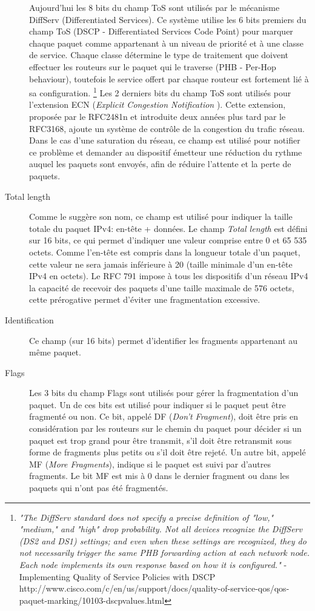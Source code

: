 \begin{description}
Aujourd'hui les 8 bits du champ ToS sont utilisés par le mécanisme DiffServ
(Differentiated Services). Ce système utilise les 6 bits premiers du champ
ToS (DSCP - Differentiated Services Code Point) pour marquer chaque paquet
comme appartenant à un niveau de priorité et à une classe de service. Chaque
classe détermine le type de traitement que doivent effectuer les routeurs sur le paquet qui le traverse
 (PHB - Per-Hop behaviour), toutefois le service offert
par chaque routeur est fortement lié à sa configuration.
\footnote {
{\it "The DiffServ standard does not specify a precise definition of "low," "medium,"
and "high" drop probability. Not all devices recognize the DiffServ (DS2 and
DS1) settings; and even when these settings are recognized, they do not
necessarily trigger the same PHB forwarding action at each network node. Each
node implements its own response based on how it is configured."} - 
Implementing Quality of Service Policies with DSCP
http://www.cisco.com/c/en/us/support/docs/quality-of-service-qos/qos-paquet-marking/10103-dscpvalues.html}
Les 2 derniers bits du champ ToS sont utilisés pour l'extension ECN ({\it Explicit Congestion
Notification }). Cette extension, proposée par le RFC2481n et introduite deux années plus tard par le RFC3168,
ajoute un système de contrôle de la congestion du trafic réseau. Dans le cas d'une saturation
du réseau, ce champ est utilisé pour notifier ce problème et demander au dispositif émetteur
une réduction du rythme auquel les paquets sont envoyés, afin de réduire l'attente et
la perte de paquets.

\item [Total length]
Comme le suggère son nom, ce champ est utilisé pour indiquer la taille totale du
paquet IPv4: en-tête + données. Le champ {\it Total length} est défini sur 16
bits, ce qui permet d'indiquer une valeur comprise entre 0 et 65 535 octets. Comme l'en-tête
est compris dans la longueur totale d'un paquet, cette valeur ne sera jamais inférieure
à 20 (taille minimale d'un en-tête IPv4 en octets).
Le RFC 791 impose à tous les dispositifs d'un réseau IPv4 la capacité de recevoir
des paquets d'une taille maximale de 576 octets, cette prérogative permet d'éviter une fragmentation excessive.

\item [Identification]
Ce champ (sur 16 bits) permet d'identifier les fragments appartenant au même paquet.

\item [Flags]
Les 3 bits du champ Flags sont utilisés pour gérer la fragmentation d'un paquet.
Un de ces bits est utilisé pour indiquer si le paquet peut être fragmenté ou
non. Ce bit, appelé DF ({\it Don't Fragment}), doit être pris en considération
par les routeurs sur le chemin du paquet pour décider si un paquet est trop grand pour être
transmit, s'il doit être retransmit sous forme de fragments plus petits ou s'il doit être rejeté. 
Un autre bit, appelé MF ({\it More Fragments}), indique si le paquet est suivi 
par d'autres fragments. Le bit MF est mis à 0 dans le dernier fragment ou dans
les paquets qui n'ont pas été fragmentés.


\end{description}
